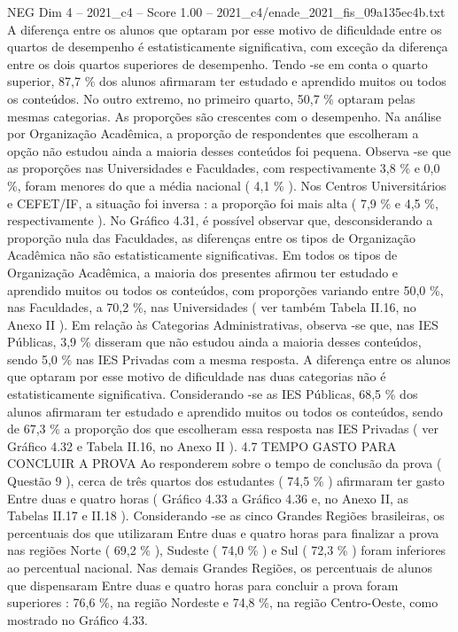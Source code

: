 \begin{textsample}{NEG Dim 4 – 2021\_c4 – Score 1.00 – 2021\_c4/enade\_2021\_fis\_09a135ec4b.txt}
A diferença entre os alunos que optaram por esse motivo de dificuldade entre os quartos de desempenho é estatisticamente significativa, com exceção da diferença entre os dois quartos superiores de desempenho.
Tendo -se em conta o quarto superior, 87,7 \% dos alunos afirmaram ter estudado e aprendido muitos ou todos os conteúdos.
No outro extremo, no primeiro quarto, 50,7 \% optaram pelas mesmas categorias.
As proporções são crescentes com o desempenho.
Na análise por Organização Acadêmica, a proporção de respondentes que escolheram a opção não estudou ainda a maioria desses conteúdos foi pequena.
Observa -se que as proporções nas Universidades e Faculdades, com respectivamente 3,8 \% e 0,0 \%, foram menores do que a média nacional ( 4,1 \% ).
Nos Centros Universitários e CEFET/IF, a situação foi inversa : a proporção foi mais alta ( 7,9 \% e 4,5 \%, respectivamente ).
No Gráfico 4.31, é possível observar que, desconsiderando a proporção nula das Faculdades, as diferenças entre os tipos de Organização Acadêmica não são estatisticamente significativas.
Em todos os tipos de Organização Acadêmica, a maioria dos presentes afirmou ter estudado e aprendido muitos ou todos os conteúdos, com proporções variando entre 50,0 \%, nas Faculdades, a 70,2 \%, nas Universidades ( ver também Tabela II.16, no Anexo II ).
Em relação às Categorias Administrativas, observa -se que, nas IES Públicas, 3,9 \% disseram que não estudou ainda a maioria desses conteúdos, sendo 5,0 \% nas IES Privadas com a mesma resposta.
A diferença entre os alunos que optaram por esse motivo de dificuldade nas duas categorias não é estatisticamente significativa.
Considerando -se as IES Públicas, 68,5 \% dos alunos afirmaram ter estudado e aprendido muitos ou todos os conteúdos, sendo de 67,3 \% a proporção dos que escolheram essa resposta nas IES Privadas ( ver Gráfico 4.32 e Tabela II.16, no Anexo II ). 4.7 TEMPO GASTO PARA CONCLUIR A PROVA Ao responderem sobre o tempo de conclusão da prova ( Questão 9 ), cerca de três quartos dos estudantes ( 74,5 \% ) afirmaram ter gasto Entre duas e quatro horas ( Gráfico 4.33 a Gráfico 4.36 e, no Anexo II, as Tabelas II.17 e II.18 ).
Considerando -se as cinco Grandes Regiões brasileiras, os percentuais dos que utilizaram Entre duas e quatro horas para finalizar a prova nas regiões Norte ( 69,2 \% ), Sudeste ( 74,0 \% ) e Sul ( 72,3 \% ) foram inferiores ao percentual nacional.
Nas demais Grandes Regiões, os percentuais de alunos que dispensaram Entre duas e quatro horas para concluir a prova foram superiores : 76,6 \%, na região Nordeste e 74,8 \%, na região Centro-Oeste, como mostrado no Gráfico 4.33.

\end{textsample}
